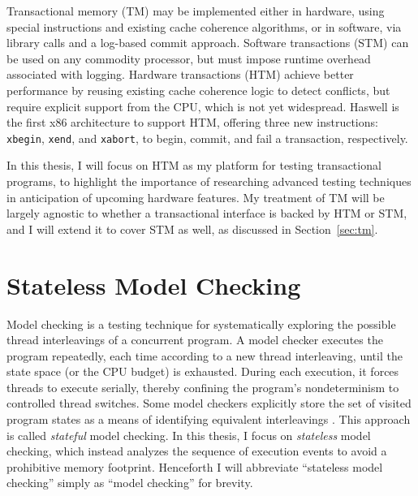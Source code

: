 Transactional memory (TM) may be implemented either in hardware, using special instructions and existing cache coherence algorithms,
or in software, via library calls and a log-based commit approach.
Software transactions (STM) \cite{stm-pldi06} can be used on any commodity processor, but must impose runtime overhead associated with logging.
Hardware transactions (HTM) \cite{htm-experience, htm-performance} achieve better performance by reusing existing cache coherence logic to detect conflicts, but require explicit support from the CPU, which is not yet widespread.
Haswell \cite{htm-haswell} is the first x86 architecture to support HTM,
offering three new instructions: \texttt{xbegin}, \texttt{xend}, and \texttt{xabort}, to begin, commit, and fail a transaction, respectively.

In this thesis, I will focus on HTM as my platform for testing transactional programs, to highlight the importance of researching advanced testing techniques in anticipation of upcoming hardware features.
My treatment of TM will be largely agnostic to whether a transactional interface is backed by HTM or STM,
and I will extend it to cover STM as well, as discussed in Section~\ref{sec:tm}.


\section{Stateless Model Checking}

Model checking \cite{verisoft} is a testing technique for systematically exploring the possible thread interleavings of a concurrent program.
A model checker executes the program repeatedly, each time according to a new thread interleaving, until the state space (or the CPU budget) is exhausted.
During each execution, it forces threads to execute serially, thereby confining the program's nondeterminism to controlled thread switches.
Some model checkers explicitly store the set of visited program states as a means of identifying equivalent interleavings \cite{spin}.
This approach is called {\em stateful} model checking.
In this thesis, I focus on {\em stateless} model checking,
which instead analyzes the sequence of execution events to avoid a prohibitive memory footprint.
Henceforth I will abbreviate ``stateless model checking'' simply as ``model checking'' for brevity.

